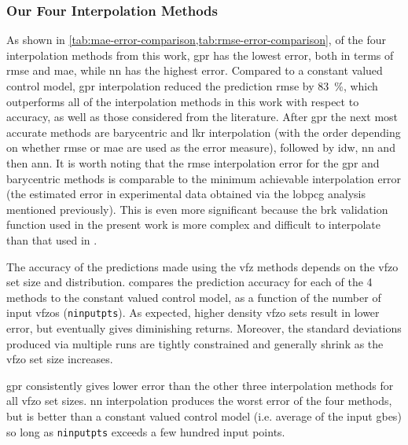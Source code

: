 \documentclass[final,twocolumn,12pt]{elsarticle}
\newcommand{\matlab}[1]{\mbox{\lstinline[style=Matlab-editor]{#1}}}
\newcommand{\inpt}{input}
\newcommand{\gprrmsePercReduction}{83}
\begin{document}
\subsubsection{Our Four Interpolation Methods}
As shown in \cref{tab:mae-error-comparison,tab:rmse-error-comparison}, of the four interpolation methods from this work, \Gls{gpr} has the lowest error, both in terms of \gls{rmse} and \gls{mae}, while \gls{nn} has the highest error. Compared to a constant valued control model, \gls{gpr} interpolation reduced the prediction \gls{rmse} by \SI{\gprrmsePercReduction}{\percent}, which outperforms all of the interpolation methods in this work with respect to accuracy, as well as those considered from the literature. After \gls{gpr} the next most accurate methods are barycentric and \gls{lkr} interpolation (with the order depending on whether \gls{rmse} or \gls{mae} are used as the error measure), followed by \gls{idw}, \gls{nn} and then \gls{ann}. It is worth noting that the \gls{rmse} interpolation error for the \gls{gpr} and barycentric methods is comparable to the minimum achievable interpolation error (the estimated error in experimental data obtained via the \gls{lobpcg} analysis mentioned previously). This is even more significant because the \gls{brk} validation function used in the present work is more complex and difficult to interpolate than that used in \cite{shenDeterminingGrainBoundary2019}.

The accuracy of the predictions made using the \gls{vfz} methods depends on the \gls{vfzo} set size and distribution. %
 compares the prediction accuracy for each of the 4 methods to the constant valued control model, as a function of the number of \inpt{} \glspl{vfzo} (\matlab{ninputpts}). As expected, higher density \gls{vfzo} sets result in lower error, but eventually gives diminishing returns. Moreover, the standard deviations produced via multiple runs are tightly constrained and generally shrink as the \gls{vfzo} set size increases. 

\Gls{gpr} consistently gives lower error than the other three interpolation methods for all \gls{vfzo} set sizes. 
\Gls{nn} interpolation produces the worst error of the four methods, but is better than a constant valued control model (i.e. average of the \inpt{} \glspl{gbe}) so long as \matlab{ninputpts} exceeds a few hundred \inpt{} points.
\end{document}
